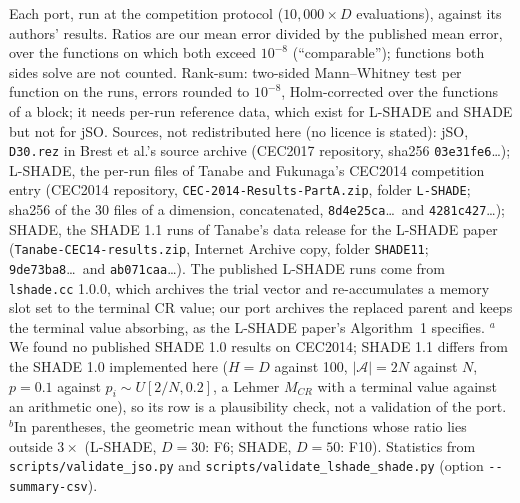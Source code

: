 \begin{table}[htbp]
\begin{flushleft}
Each port, run at the competition protocol ($10{,}000\times D$ evaluations), against its authors' results. Ratios are our mean error divided by the published mean error, over the functions on which both exceed $10^{-8}$ (``comparable''); functions both sides solve are not counted. Rank-sum: two-sided Mann--Whitney test per function on the runs, errors rounded to $10^{-8}$, Holm-corrected over the functions of a block; it needs per-run reference data, which exist for L-SHADE and SHADE but not for jSO. Sources, not redistributed here (no licence is stated): jSO, \texttt{D30.rez} in Brest et al.'s source archive (CEC2017 repository, sha256 \texttt{03e31fe6}\ldots); L-SHADE, the per-run files of Tanabe and Fukunaga's CEC2014 competition entry (CEC2014 repository, \texttt{CEC-2014-Results-PartA.zip}, folder \texttt{L-SHADE}; sha256 of the 30 files of a dimension, concatenated, \texttt{8d4e25ca}\ldots\ and \texttt{4281c427}\ldots); SHADE, the SHADE 1.1 runs of Tanabe's data release for the L-SHADE paper (\texttt{Tanabe-CEC14-results.zip}, Internet Archive copy, folder \texttt{SHADE11}; \texttt{9de73ba8}\ldots\ and \texttt{ab071caa}\ldots). The published L-SHADE runs come from \texttt{lshade.cc} 1.0.0, which archives the trial vector and re-accumulates a memory slot set to the terminal CR value; our port archives the replaced parent and keeps the terminal value absorbing, as the L-SHADE paper's Algorithm~1 specifies. $^{a}$We found no published SHADE 1.0 results on CEC2014; SHADE 1.1 differs from the SHADE 1.0 implemented here ($H=D$ against 100, $|\mathcal{A}|=2N$ against $N$, $p=0.1$ against $p_i\sim U[2/N,0.2]$, a Lehmer $M_{CR}$ with a terminal value against an arithmetic one), so its row is a plausibility check, not a validation of the port. $^{b}$In parentheses, the geometric mean without the functions whose ratio lies outside $3\times$ (L-SHADE, $D=30$: F6; SHADE, $D=50$: F10). Statistics from \texttt{scripts/validate\_jso.py} and \texttt{scripts/validate\_lshade\_shade.py} (option \texttt{-{}-summary-csv}).
\end{flushleft}
\end{table}
